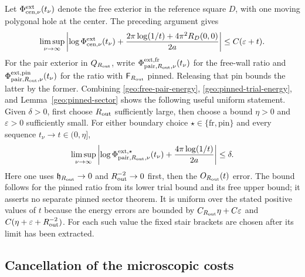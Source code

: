 Let \(\Phi_{{\rm cen},\nu}^{\rm ext}(t_\nu)\) denote the free exterior in
the reference square \(D\), with one moving polygonal hole at the center.
The preceding argument gives
\begin{equation}\label{geo:center-exterior}
 \limsup_{\nu\to\infty}\left|
 \log\Phi_{{\rm cen},\nu}^{\rm ext}(t_\nu)+
       \frac{2\pi\log(1/t)+4\pi^2R_D(0,0)}{2a}\right|
                      \le C(\varepsilon+t).
\end{equation}
For the pair exterior in \(Q_{R_{\rm out}}\), write
\(\Phi_{{\rm pair},R_{\rm out},\nu}^{\rm ext,fr}(t_\nu)\) for the free-wall ratio and
\(\Phi_{{\rm pair},R_{\rm out},\nu}^{\rm ext,pin}(t_\nu)\) for the ratio with
\(\mathsf F_{R_{\rm out}}\) pinned.  Releasing that pin bounds the latter by the
former.  Combining \eqref{geo:free-pair-energy},
\eqref{geo:pinned-trial-energy}, and Lemma~\ref{geo:pinned-sector}
shows the following useful uniform statement.  Given \(\delta>0\),
first choose \(R_{\rm out}\) sufficiently large, then choose a bound
\(\eta>0\) and \(\varepsilon>0\) sufficiently small.  For either
boundary choice \(\star\in\{\mathrm{fr},\mathrm{pin}\}\) and every
sequence \(t_\nu\to t\in(0,\eta]\),
\begin{equation}\label{geo:pair-exterior}
 \limsup_{\nu\to\infty}\left|
    \log\Phi_{{\rm pair},R_{\rm out},\nu}^{\mathrm{ext},\star}(t_\nu)
                      +\frac{4\pi\log(1/t)}{2a}\right|\le\delta.
\end{equation}
Here one uses \(\mathfrak h_{R_{\rm out}}\to0\) and \(R_{\rm out}^{-2}\to0\) first, then the
\(O_{R_{\rm out}}(t)\) error.  The bound follows for the pinned ratio from its
lower trial bound and its free upper bound; it asserts no separate
pinned sector theorem.  It is uniform over the stated positive values
of \(t\) because the energy errors are bounded by
\(C_{R_{\rm out}}\eta+C\varepsilon\) and \(C(\eta+\varepsilon+R_{\rm out}^{-2})\).
For each such value the fixed stair brackets are chosen after its
limit has been extracted.

\subsection{Cancellation of the microscopic costs}

